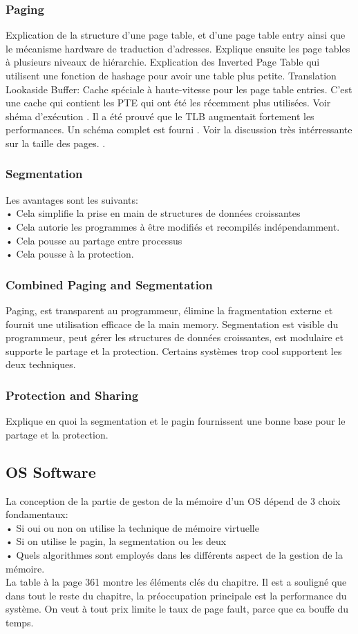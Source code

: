 \subsubsection{Paging}
Explication de la structure d'une page table, et d'une page table entry ainsi que le mécanisme hardware de traduction d'adresses. Explique ensuite les page tables à plusieurs niveaux de hiérarchie. Explication des Inverted Page Table qui utilisent une fonction de hashage pour avoir une table plus petite.
Translation Lookaside Buffer: Cache spéciale à haute-vitesse pour les page table entries. C'est une cache qui contient les PTE qui ont été les récemment plus utilisées. Voir shéma d'exécution \cite[p.~351]{stallings}. Il a été prouvé que le TLB augmentait fortement les performances. Un schéma complet est fourni \cite[p.~352-353]{stallings}. Voir la discussion très intérressante sur la taille des pages. \cite[p.~354-355]{stallings}.
\subsubsection{Segmentation}
Les avantages sont les suivants:\\
• Cela simplifie la prise en main de structures de données croissantes\\
• Cela autorie les programmes à être modifiés et recompilés indépendamment.\\
• Cela pousse au partage entre processus\\
• Cela pousse à la protection.
\subsubsection{Combined Paging and Segmentation}
Paging, est transparent au programmeur, élimine la fragmentation externe et fournit une utilisation efficace de la main memory.
Segmentation est visible du programmeur, peut gérer les structures de données croissantes, est modulaire et supporte le partage et la protection.
Certains systèmes trop cool supportent les deux techniques.
\subsubsection{Protection and Sharing}
Explique en quoi la segmentation et le pagin fournissent une bonne base pour le partage et la protection.
\subsection{OS Software}
La conception de la partie de geston de la mémoire d'un OS dépend de 3 choix fondamentaux:\\
• Si oui ou non on utilise la technique de mémoire virtuelle\\
• Si on utilise le pagin, la segmentation ou les deux\\
• Quels algorithmes sont employés dans les différents aspect de la gestion de la mémoire.\\
La table à la page 361 montre les éléments clés du chapitre. Il est a souligné que dans tout le reste du chapitre, la préoccupation principale est la performance du système. On veut à tout prix limite le taux de page fault, parce que ca bouffe du temps.
